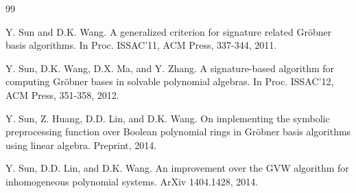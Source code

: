\documentclass[final, number, 3p,12pt]{elsarticle}
\begin{document}
\begin{thebibliography}{99}





Y. Sun and D.K. Wang. A generalized criterion for signature related Gr\"obner basis algorithms. In Proc. ISSAC'11, ACM Press, 337-344, 2011.


Y. Sun, D.K. Wang, D.X. Ma, and Y. Zhang. A signature-based algorithm for computing Gr\"obner bases in solvable polynomial algebras. In Proc. ISSAC'12, ACM Press, 351-358, 2012.





Y. Sun, Z. Huang, D.D. Lin, and D.K. Wang. On implementing the symbolic preprocessing function over Boolean polynomial rings in Gr\"obner basis algorithms using linear algebra. Preprint, 2014.

Y. Sun, D.D. Lin, and D.K. Wang. An improvement over the GVW algorithm for inhomogeneous polynomial systems. ArXiv 1404.1428, 2014.




%

\end{thebibliography}
\end{document}

